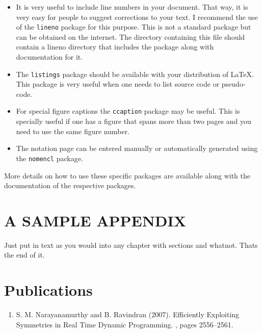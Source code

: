 \documentclass[MTech]{iitmdiss}
\begin{document}
 \begin{itemize}  
 \item It is very useful to include line numbers in your document.
   That way, it is very easy for people to suggest corrections to your
   text.  I recommend the use of the \texttt{lineno} package for this
   purpose.  This is not a standard package but can be obtained on the
   internet.  The directory containing this file should contain a
   lineno directory that includes the package along with documentation
   for it.
 
 \item The \texttt{listings} package should be available with your
   distribution of \LaTeX.  This package is very useful when one needs
   to list source code or pseudo-code.
 
 \item For special figure captions the \texttt{ccaption} package may be
   useful.  This is specially useful if one has a figure that spans
   more than two pages and you need to use the same figure number.
 
 \item The notation page can be entered manually or automatically
   generated using the \texttt{nomencl} package.
 
 \end{itemize}
 
 More details on how to use these specific packages are available along
 with the documentation of the respective packages.


 \appendix
 
 \chapter{A SAMPLE APPENDIX}
 
 Just put in text as you would into any chapter with sections and
 whatnot.  Thats the end of it.


\chapter*{Publications}
\vspace{-0.3cm}

\begin{enumerate}
\item S. M. Narayanamurthy and B. Ravindran (2007). \newblock
  Efficiently Exploiting Symmetries in Real Time Dynamic Programming. , pages 2556--2561.
\end{enumerate}
\end{document}
